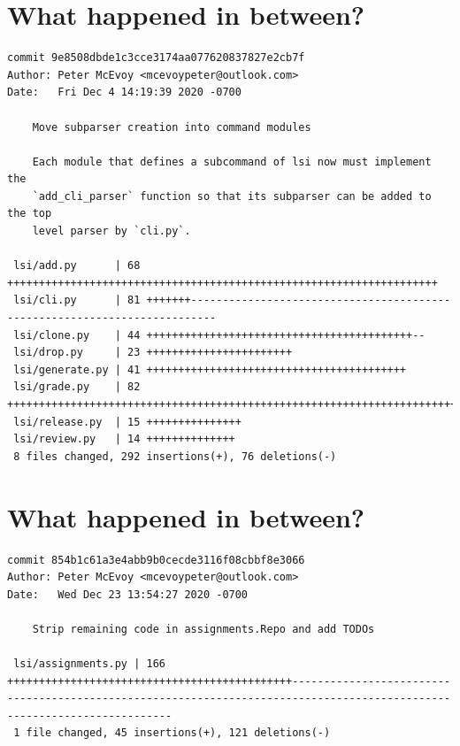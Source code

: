 \documentclass{article}
\begin{document}
\newpage

\section*{What happened in between?}
\vspace{2ex}
\begin{verbatim}
commit 9e8508dbde1c3cce3174aa077620837827e2cb7f
Author: Peter McEvoy <mcevoypeter@outlook.com>
Date:   Fri Dec 4 14:19:39 2020 -0700

    Move subparser creation into command modules
    
    Each module that defines a subcommand of lsi now must implement the
    `add_cli_parser` function so that its subparser can be added to the top
    level parser by `cli.py`.

 lsi/add.py      | 68 ++++++++++++++++++++++++++++++++++++++++++++++++++++++++++++++++++++
 lsi/cli.py      | 81 +++++++--------------------------------------------------------------------------
 lsi/clone.py    | 44 ++++++++++++++++++++++++++++++++++++++++++--
 lsi/drop.py     | 23 +++++++++++++++++++++++
 lsi/generate.py | 41 +++++++++++++++++++++++++++++++++++++++++
 lsi/grade.py    | 82 ++++++++++++++++++++++++++++++++++++++++++++++++++++++++++++++++++++++++++++++++++
 lsi/release.py  | 15 +++++++++++++++
 lsi/review.py   | 14 ++++++++++++++
 8 files changed, 292 insertions(+), 76 deletions(-)

\end{verbatim}

\newpage

\section*{What happened in between?}
\vspace{2ex}
\begin{verbatim}
commit 854b1c61a3e4abb9b0cecde3116f08cbbf8e3066
Author: Peter McEvoy <mcevoypeter@outlook.com>
Date:   Wed Dec 23 13:54:27 2020 -0700

    Strip remaining code in assignments.Repo and add TODOs

 lsi/assignments.py | 166 +++++++++++++++++++++++++++++++++++++++++++++-------------------------------------------------------------------------------------------------------------------------
 1 file changed, 45 insertions(+), 121 deletions(-)

\end{verbatim}
\end{document}
